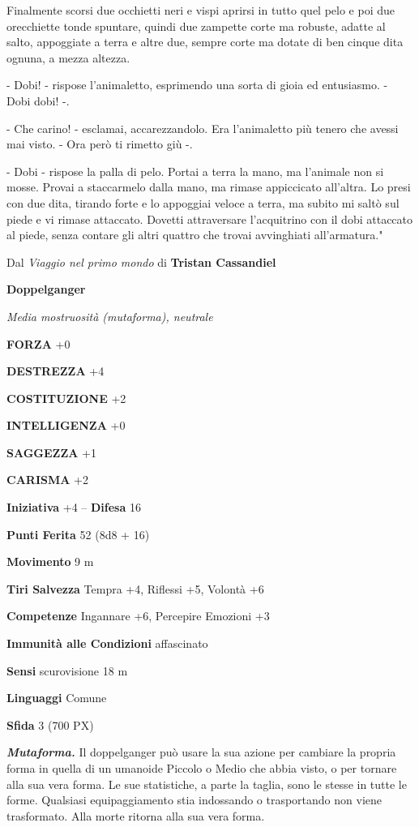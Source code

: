\begin{multicols}{2}
{		Finalmente scorsi due occhietti neri e vispi aprirsi in tutto quel pelo e poi due orecchiette tonde spuntare, quindi due zampette corte ma robuste, adatte al salto, appoggiate a terra e altre due, sempre corte ma dotate di ben cinque dita ognuna, a mezza altezza.

		- Dobi! - rispose l’animaletto, esprimendo una sorta di gioia ed entusiasmo. - Dobi dobi! -.

		- Che carino! - esclamai, accarezzandolo. Era l’animaletto più tenero che avessi mai visto. - Ora però ti rimetto giù -.

		- Dobi - rispose la palla di pelo.
		Portai a terra la mano, ma l'animale non si mosse. Provai a staccarmelo dalla mano, ma rimase appiccicato all'altra. Lo presi con due dita, tirando forte e lo appoggiai veloce a terra, ma subito mi saltò sul piede e vi rimase attaccato. Dovetti attraversare l'acquitrino con il dobi attaccato al piede, senza contare gli altri quattro che trovai avvinghiati all'armatura."

		Dal \textit{Viaggio nel primo mondo} di \textbf{Tristan Cassandiel}}


	\medskip{}\textbf{Doppelganger}

	\textit{Media mostruosità (mutaforma), neutrale}

	\textbf{FORZA} +0

	\textbf{DESTREZZA} +4

	\textbf{COSTITUZIONE} +2

	\textbf{INTELLIGENZA} +0

	\textbf{SAGGEZZA} +1

	\textbf{CARISMA} +2

	\textbf{Iniziativa} +4 -- \textbf{Difesa} 16

	\textbf{Punti Ferita} 52 (8d8 + 16)

	\textbf{Movimento} 9 m

	\textbf{Tiri Salvezza} Tempra +4, Riflessi +5, Volontà +6

	\textbf{Competenze} Ingannare +6, Percepire Emozioni +3

	\textbf{Immunità alle Condizioni} affascinato

	\textbf{Sensi} scurovisione 18 m

	\textbf{Linguaggi} Comune

	\textbf{Sfida} 3 (700 PX)

	\textit{\textbf{Mutaforma.}} Il doppelganger può usare la sua azione per cambiare la propria forma in quella di un umanoide Piccolo o Medio che abbia visto, o per tornare alla sua vera forma. Le sue statistiche, a parte la taglia, sono le stesse in tutte le forme. Qualsiasi equipaggiamento stia indossando o trasportando non viene trasformato. Alla morte ritorna alla sua vera forma.


\end{multicols}
